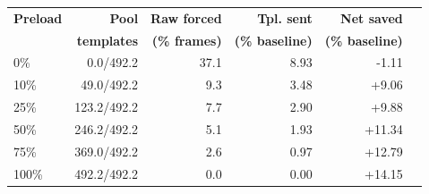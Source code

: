 \begin{tabular}{@{}lrrrrr@{}}
\toprule
\textbf{Preload} & \textbf{Pool} & \textbf{Raw forced} & \textbf{Tpl. sent} & \textbf{Net saved}  \\
& \textbf{templates} & \textbf{(\% frames)} & \textbf{(\% baseline)} & \textbf{(\% baseline)} \\
\midrule
0\% & 0.0/492.2 & 37.1 & 8.93 & -1.11 \\
10\% & 49.0/492.2 & 9.3 & 3.48 & +9.06 \\
25\% & 123.2/492.2 & 7.7 & 2.90 & +9.88 \\
50\% & 246.2/492.2 & 5.1 & 1.93 & +11.34 \\
75\% & 369.0/492.2 & 2.6 & 0.97 & +12.79 \\
100\% & 492.2/492.2 & 0.0 & 0.00 & +14.15 \\
\bottomrule
\end{tabular}

